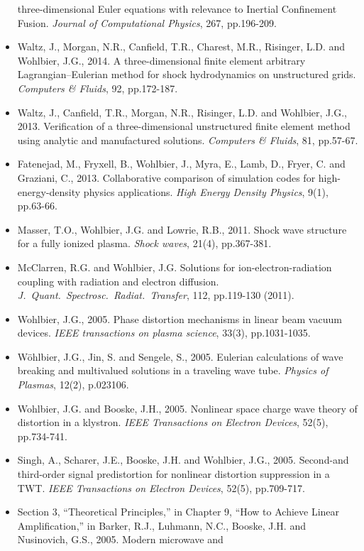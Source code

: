 \documentclass{muratcan_cv}
\begin{document}
\begin{itemize}
  three-dimensional Euler equations with relevance to Inertial
  Confinement Fusion. {\it Journal of Computational Physics}, 267,
  pp.196-209.
\item Waltz, J., Morgan, N.R., Canfield, T.R., Charest, M.R.,
  Risinger, L.D. and Wohlbier, J.G., 2014. A three-dimensional
  finite element arbitrary Lagrangian–Eulerian method for shock
  hydrodynamics on unstructured grids. {\it Computers \& Fluids}, 92,
  pp.172-187.
\item Waltz, J., Canfield, T.R., Morgan, N.R., Risinger, L.D. and
  Wohlbier, J.G., 2013. Verification of a three-dimensional
  unstructured finite element method using analytic and manufactured
  solutions. {\it Computers \& Fluids}, 81, pp.57-67.
\item Fatenejad, M., Fryxell, B., Wohlbier, J., Myra, E., Lamb, D.,
  Fryer, C. and Graziani, C., 2013. Collaborative comparison of
  simulation codes for high-energy-density physics applications. {\it High
    Energy Density Physics}, 9(1), pp.63-66.
\item Masser, T.O., Wohlbier, J.G. and Lowrie, R.B., 2011. Shock wave
  structure for a fully ionized plasma. {\it Shock waves}, 21(4),
  pp.367-381.
\item McClarren, R.G. and Wohlbier, J.G. Solutions for
  ion-electron-radiation coupling with radiation and electron
  diffusion. {\it J.~Quant.~Spectrosc.~Radiat.~Transfer}, 112, pp.119-130
  (2011).
\item Wohlbier, J.G., 2005. Phase distortion mechanisms in linear beam
  vacuum devices. {\it IEEE transactions on plasma science}, 33(3),
  pp.1031-1035.
\item Wöhlbier, J.G., Jin, S. and Sengele, S., 2005. Eulerian
  calculations of wave breaking and multivalued solutions in a
  traveling wave tube. {\it Physics of Plasmas}, 12(2), p.023106.
\item Wohlbier, J.G. and Booske, J.H., 2005. Nonlinear space charge
  wave theory of distortion in a klystron. {\it IEEE Transactions on
    Electron Devices}, 52(5), pp.734-741.
\item Singh, A., Scharer, J.E., Booske, J.H. and Wohlbier, J.G.,
  2005. Second-and third-order signal predistortion for nonlinear
  distortion suppression in a TWT. {\it IEEE Transactions on Electron
    Devices}, 52(5), pp.709-717.
\item Section 3, ``Theoretical Principles,'' in Chapter 9,
  ``How to Achieve Linear Amplification,'' in Barker, R.J., Luhmann,
  N.C., Booske, J.H. and Nusinovich, G.S., 2005. Modern microwave and

\end{itemize}
\end{document}
